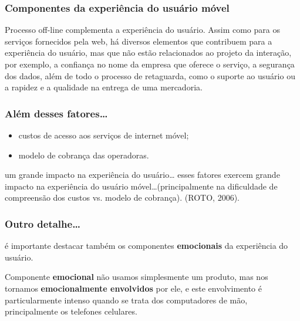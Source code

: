 \documentclass[presentation]{beamer}
\begin{document}
\begin{frame}[c]\frametitle{Componentes da experiência do usuário móvel}
    
    \begin{block}{Processo off-line}
        complementa a experiência do usuário. Assim como para os serviços fornecidos pela web, há diversos elementos que contribuem para a experiência do usuário, mas que não estão relacionados ao projeto da interação, por exemplo, a confiança no nome da empresa que oferece o serviço, a segurança dos dados, além de todo o processo de retaguarda, como o suporte ao usuário ou a rapidez e a qualidade na entrega de uma mercadoria.
    \end{block}

\end{frame}

\begin{frame}[c]\frametitle{Além desses fatores\ldots}
    
    \begin{itemize}
        \item custos de acesso aos serviços de internet móvel;
        \item modelo de cobrança das operadoras.
    \end{itemize}

    \begin{block}{um grande impacto na experiência do usuário\ldots}
        esses fatores exercem grande impacto na experiência do usuário móvel\ldots (principalmente na dificuldade de compreensão dos custos vs. modelo de cobrança). (ROTO, 2006).
    \end{block}
    
\end{frame}


\begin{frame}[c]\frametitle{Outro detalhe\ldots}
    
    é importante destacar também os componentes \textbf{emocionais} da experiência do usuário.

    \begin{block}{Componente \textbf{emocional}}
        não usamos simplesmente um produto, mas nos tornamos \textbf{emocionalmente envolvidos} por ele, e este envolvimento é particularmente intenso quando se trata dos computadores de mão, principalmente os telefones celulares.
    \end{block}

\end{frame}
\end{document}
